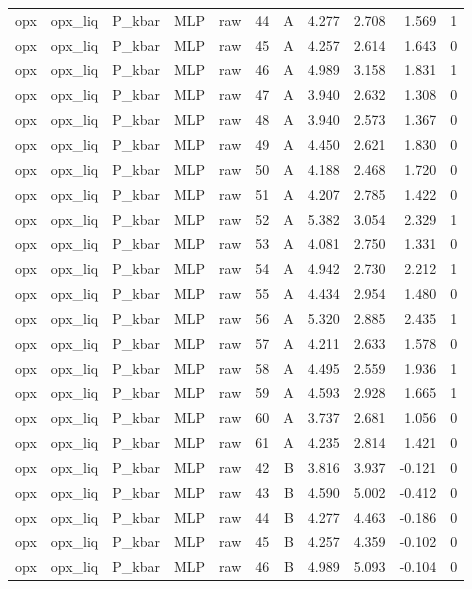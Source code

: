 \begin{longtable}{lllllrrrrrr}
opx & opx\_liq & P\_kbar & MLP & raw & 44 & A & 4.277 & 2.708 & 1.569 & 1 \\
opx & opx\_liq & P\_kbar & MLP & raw & 45 & A & 4.257 & 2.614 & 1.643 & 0 \\
opx & opx\_liq & P\_kbar & MLP & raw & 46 & A & 4.989 & 3.158 & 1.831 & 1 \\
opx & opx\_liq & P\_kbar & MLP & raw & 47 & A & 3.940 & 2.632 & 1.308 & 0 \\
opx & opx\_liq & P\_kbar & MLP & raw & 48 & A & 3.940 & 2.573 & 1.367 & 0 \\
opx & opx\_liq & P\_kbar & MLP & raw & 49 & A & 4.450 & 2.621 & 1.830 & 0 \\
opx & opx\_liq & P\_kbar & MLP & raw & 50 & A & 4.188 & 2.468 & 1.720 & 0 \\
opx & opx\_liq & P\_kbar & MLP & raw & 51 & A & 4.207 & 2.785 & 1.422 & 0 \\
opx & opx\_liq & P\_kbar & MLP & raw & 52 & A & 5.382 & 3.054 & 2.329 & 1 \\
opx & opx\_liq & P\_kbar & MLP & raw & 53 & A & 4.081 & 2.750 & 1.331 & 0 \\
opx & opx\_liq & P\_kbar & MLP & raw & 54 & A & 4.942 & 2.730 & 2.212 & 1 \\
opx & opx\_liq & P\_kbar & MLP & raw & 55 & A & 4.434 & 2.954 & 1.480 & 0 \\
opx & opx\_liq & P\_kbar & MLP & raw & 56 & A & 5.320 & 2.885 & 2.435 & 1 \\
opx & opx\_liq & P\_kbar & MLP & raw & 57 & A & 4.211 & 2.633 & 1.578 & 0 \\
opx & opx\_liq & P\_kbar & MLP & raw & 58 & A & 4.495 & 2.559 & 1.936 & 1 \\
opx & opx\_liq & P\_kbar & MLP & raw & 59 & A & 4.593 & 2.928 & 1.665 & 1 \\
opx & opx\_liq & P\_kbar & MLP & raw & 60 & A & 3.737 & 2.681 & 1.056 & 0 \\
opx & opx\_liq & P\_kbar & MLP & raw & 61 & A & 4.235 & 2.814 & 1.421 & 0 \\
opx & opx\_liq & P\_kbar & MLP & raw & 42 & B & 3.816 & 3.937 & -0.121 & 0 \\
opx & opx\_liq & P\_kbar & MLP & raw & 43 & B & 4.590 & 5.002 & -0.412 & 0 \\
opx & opx\_liq & P\_kbar & MLP & raw & 44 & B & 4.277 & 4.463 & -0.186 & 0 \\
opx & opx\_liq & P\_kbar & MLP & raw & 45 & B & 4.257 & 4.359 & -0.102 & 0 \\
opx & opx\_liq & P\_kbar & MLP & raw & 46 & B & 4.989 & 5.093 & -0.104 & 0 \\

\end{longtable}
